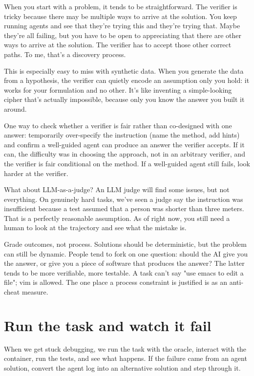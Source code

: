 \documentclass[11pt]{article}
\begin{document}
When you start with a problem, it tends to be straightforward. The verifier is tricky because there may be multiple ways to arrive at the solution. You keep running agents and see that they're trying this and they're trying that. Maybe they're all failing, but you have to be open to appreciating that there are other ways to arrive at the solution. The verifier has to accept those other correct paths. To me, that's a discovery process.

This is especially easy to miss with synthetic data. When you generate the data from a hypothesis, the verifier can quietly encode an assumption only you hold: it works for your formulation and no other. It's like inventing a simple-looking cipher that's actually impossible, because only you know the answer you built it around.

One way to check whether a verifier is fair rather than co-designed with one answer: temporarily over-specify the instruction (name the method, add hints) and confirm a well-guided agent can produce an answer the verifier accepts. If it can, the difficulty was in choosing the approach, not in an arbitrary verifier, and the verifier is fair conditional on the method. If a well-guided agent still fails, look harder at the verifier.

What about LLM-as-a-judge? An LLM judge will find some issues, but not everything. On genuinely hard tasks, we've seen a judge say the instruction was insufficient because a test assumed that a person was shorter than three meters. That is a perfectly reasonable assumption. As of right now, you still need a human to look at the trajectory and see what the mistake is.

Grade outcomes, not process. Solutions should be deterministic, but the problem can still be dynamic. People tend to fork on one question: should the AI give you the answer, or give you a piece of software that produces the answer? The latter tends to be more verifiable, more testable. A task can't say "use emacs to edit a file"; vim is allowed. The one place a process constraint is justified is as an anti-cheat measure.

\section{Run the task and watch it fail}

When we get stuck debugging, we run the task with the oracle, interact with the container, run the tests, and see what happens. If the failure came from an agent solution, convert the agent log into an alternative solution and step through it.
\end{document}
